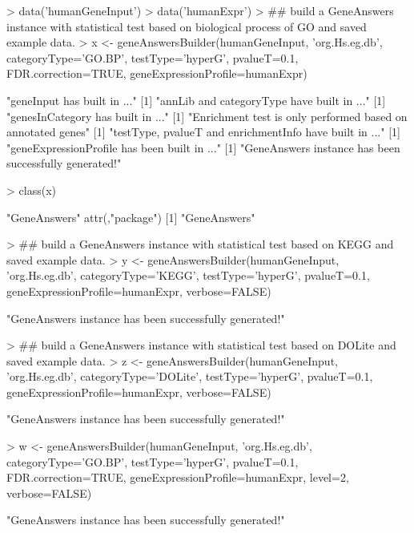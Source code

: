 \documentclass[a4paper]{article}
\begin{document}
\begin{Schunk}
\begin{Sinput}
> data('humanGeneInput')
> data('humanExpr')
> ## build a GeneAnswers instance with statistical test based on biological process of GO and saved example data.
> x <- geneAnswersBuilder(humanGeneInput, 'org.Hs.eg.db', categoryType='GO.BP', testType='hyperG',  pvalueT=0.1, FDR.correction=TRUE, geneExpressionProfile=humanExpr)
\end{Sinput}
\begin{Soutput}
[1] "geneInput has built in ..."
[1] "annLib and categoryType have built in ..."
[1] "genesInCategory has built in ..."
[1] "Enrichment test is only performed based on annotated genes"
[1] "testType, pvalueT and enrichmentInfo have built in ..."
[1] "geneExpressionProfile has been built in ..."
[1] "GeneAnswers instance has been successfully generated!"
\end{Soutput}
\begin{Sinput}
> class(x)
\end{Sinput}
\begin{Soutput}
[1] "GeneAnswers"
attr(,"package")
[1] "GeneAnswers"
\end{Soutput}
\begin{Sinput}
> ## build a GeneAnswers instance with statistical test based on KEGG and saved example data. 
> y <- geneAnswersBuilder(humanGeneInput, 'org.Hs.eg.db', categoryType='KEGG', testType='hyperG', pvalueT=0.1, geneExpressionProfile=humanExpr, verbose=FALSE)
\end{Sinput}
\begin{Soutput}
[1] "GeneAnswers instance has been successfully generated!"
\end{Soutput}
\begin{Sinput}
> ## build a GeneAnswers instance with statistical test based on DOLite and saved example data.
> z <- geneAnswersBuilder(humanGeneInput, 'org.Hs.eg.db', categoryType='DOLite', testType='hyperG', pvalueT=0.1, geneExpressionProfile=humanExpr, verbose=FALSE)
\end{Sinput}
\begin{Soutput}
[1] "GeneAnswers instance has been successfully generated!"
\end{Soutput}
\begin{Sinput}
> w <- geneAnswersBuilder(humanGeneInput, 'org.Hs.eg.db', categoryType='GO.BP', testType='hyperG', pvalueT=0.1, FDR.correction=TRUE, geneExpressionProfile=humanExpr, level=2, verbose=FALSE) 
\end{Sinput}
\begin{Soutput}
[1] "GeneAnswers instance has been successfully generated!"
\end{Soutput}
\end{Schunk}
\end{document}
